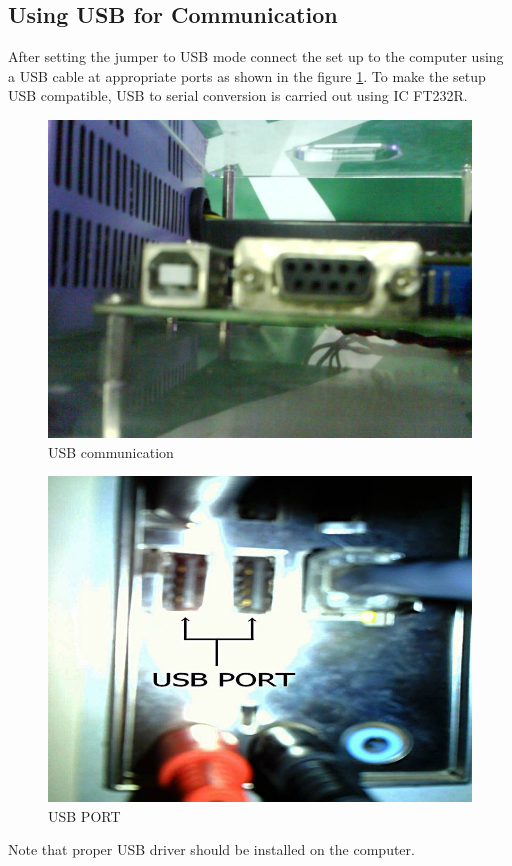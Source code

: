 \documentclass[12pt]{report}
\begin{document}
\subsection{Using USB for Communication}
After setting the jumper to USB mode connect the set up to the computer using a USB cable at appropriate ports as shown in the figure \ref{USB Port}. To make the setup USB compatible, USB to serial conversion is carried out using IC FT232R.
\begin{figure}
\centering
\includegraphics[width=0.5\linewidth]{usbc.jpg}
\caption{USB communication}
\end{figure}
\begin{figure}
\centering
\includegraphics[width=0.5\linewidth]{usbp.jpg}
\caption{USB PORT}
\label{USB Port}
\end{figure}
Note that proper USB driver should be installed on the computer.
\end{document}
